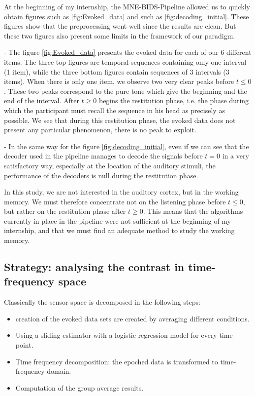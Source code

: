 At the beginning of my internship, the MNE-BIDS-Pipeline allowed us to quickly obtain figures such as \ref{fig:Evoked_data} and such as \ref{fig:decoding_initial}. These figures show that the preprocessing went well since the results are clean. But these two figures also present some limits in the framework of our paradigm.

- The figure \ref{fig:Evoked_data} presents the evoked data for each of our 6 different items. The three top figures are temporal sequences containing only one interval (1 item), while the three bottom figures contain sequences of 3 intervals (3 items). 
When there is only one item, we observe two very clear peaks before $t \leq 0$. These two peaks correspond to the pure tone which give the beginning and the end of the interval. After $t \geq 0$ begins the restitution phase, i.e. the phase during which the participant must recall the sequence in his head as precisely as possible. We see that during this restitution phase, the evoked data does not present any particular phenomenon, there is no peak to exploit. 

- In the same way for the figure \ref{fig:decoding_initial}, even if we can see that the decoder used in the pipeline manages to decode the signals before $t=0$ in a very satisfactory way, especially at the location of the auditory stimuli, the performance of the decoders is null during the restitution phase.

In this study, we are not interested in the auditory cortex, but in the working memory. We must therefore concentrate not on the listening phase before $t \leq 0$, but rather on the restitution phase after $t \geq 0$. This means that the algorithms currently in place in the pipeline were not sufficient at the beginning of my internship, and that we must find an adequate method to study the working memory.

\subsection{Strategy: analysing the contrast in time-frequency space}

Classically the sensor space is decomposed in the following steps:
\begin{itemize}
    \item creation of the evoked data sets are created by averaging different conditions.
    \item Using a sliding estimator with a logistic regression model for every time point.
    \item Time frequency decomposition: the epoched data is transformed to time-frequency domain.
    \item Computation of the group average results.
\end{itemize}

